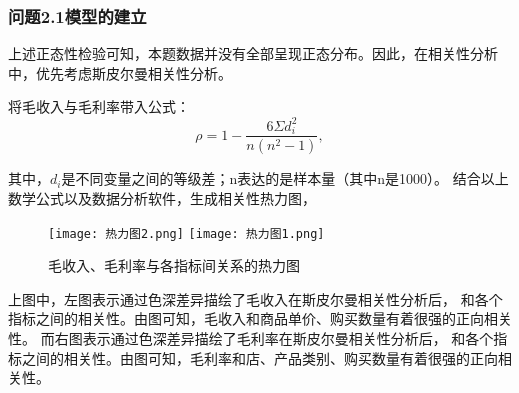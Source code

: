 \documentclass[withoutpreface,bwprint]{cumcmthesis}
\begin{document}
\subsubsection{问题2.1模型的建立}
上述正态性检验可知，本题数据并没有全部呈现正态分布。因此，在相关性分析中，优先考虑斯皮尔曼相关性分析。
\par
将毛收入与毛利率带入公式：
\begin{equation}
\label{eq:公式}
\rho=1-\frac{6\Sigma d_i^2}{n(n^2-1)},
\end{equation}
\par
其中，$d_i$是不同变量之间的等级差；n表达的是样本量（其中n是1000）。
结合以上数学公式以及数据分析软件，生成相关性热力图，
\begin{figure}[H]
\centering
{}
{\texttt{[image: 热力图2.png]}}
{\texttt{[image: 热力图1.png]}}
\caption{毛收入、毛利率与各指标间关系的热力图}\label{fig:双图aaa}
\end{figure} 

\par
上图中，左图表示通过色深差异描绘了毛收入在斯皮尔曼相关性分析后，
和各个指标之间的相关性。由图可知，毛收入和商品单价、购买数量有着很强的正向相关性。
而右图表示通过色深差异描绘了毛利率在斯皮尔曼相关性分析后，
和各个指标之间的相关性。由图可知，毛利率和店、产品类别、购买数量有着很强的正向相关性。
\end{document}
